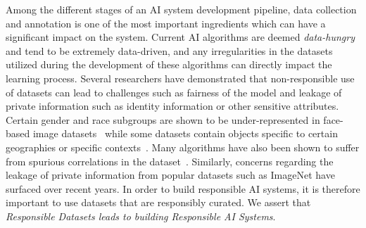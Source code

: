 \documentclass[journal]{IEEEtran}
\begin{document}
Among the different stages of an AI system development pipeline, data collection and annotation is one of the most important ingredients which can have a significant impact on the system. Current AI algorithms are deemed \textit{data-hungry} and tend to be extremely data-driven, and any irregularities in the datasets utilized during the development of these algorithms can directly impact the learning process. Several researchers have demonstrated that non-responsible use of datasets can lead to challenges such as fairness of the model and leakage of private information such as identity information or other sensitive attributes. Certain gender and race subgroups are shown to be under-represented in face-based image datasets~\cite{cao2018vggface2,yi2014learning} while some datasets contain objects specific to certain geographies or specific contexts~\cite{deng2009imagenet,rojasdollar}. Many algorithms have also been shown to suffer from spurious correlations in the dataset~\cite{geirhos2020shortcut,li2022whac,mehta2022you}. Similarly, concerns regarding the leakage of private information from popular datasets such as ImageNet have surfaced over recent years. In order to build responsible AI systems, it is therefore important to use datasets that are responsibly curated. We assert that \textit{Responsible Datasets leads to building Responsible AI Systems}. 








\end{document}
